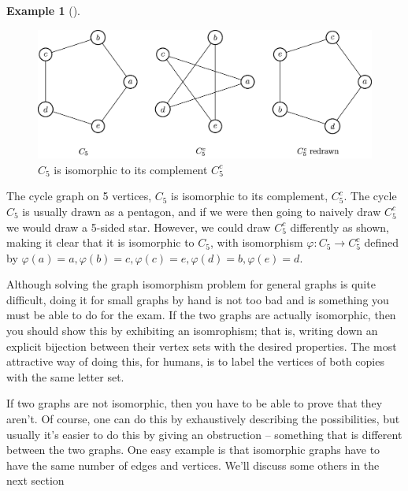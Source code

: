 \documentclass[10pt,]{book}
\theoremstyle{plain}
\theoremstyle{definition}
\theoremstyle{definition}
\theoremstyle{definition}
\newtheorem{example}[theorem]{Example}
\theoremstyle{definition}
\numberwithin{equation}{section}
\begin{document}
\begin{example}[]\label{example-8}
\leavevmode%
\begin{figure}
\centering
\includegraphics[width=0.9\linewidth]{images/cycleandstar.jpg}
\caption{\(C_5\) is isomorphic to its complement \(C_5^c\)\label{figure-2}}
\end{figure}
\hypertarget{p-43}{}%
The cycle graph on 5 vertices, \(C_5\) is isomorphic to its complement, \(C_5^c\).  The cycle \(C_5\) is usually drawn as a pentagon, and if we were then going to naively draw \(C_5^c\) we would draw a 5-sided star.  However, we could draw \(C_5^c\) differently as shown, making it clear that it is isomorphic to \(C_5\), with isomorphism \(\varphi:C_5\to C_5^c\) defined by \(\varphi(a)=a, \varphi(b)=c, \varphi(c)=e, \varphi(d)=b, \varphi(e)=d\).%
\end{example}
\hypertarget{p-44}{}%
Although solving the graph isomorphism problem for general graphs is quite difficult, doing it for small graphs by hand is not too bad and is something you must be able to do for the exam.  If the two graphs are actually isomorphic, then you should show this by exhibiting an isomrophism; that is, writing down an explicit bijection between their vertex sets with the desired properties. The most attractive way of doing this, for humans, is to label the vertices of both copies with the same letter set.%
\par
\hypertarget{p-45}{}%
If two graphs are not isomorphic, then you have to be able to prove that they aren't. Of course, one can do this by exhaustively describing the possibilities, but usually it's easier to do this by giving an obstruction – something that is different between the two graphs. One easy example is that isomorphic graphs have to have the same number of edges and vertices. We'll discuss some others in the next section%
\typeout{************************************************}
\typeout{************************************************}
\end{document}
